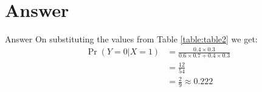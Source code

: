 \documentclass{beamer}
\providecommand{\pr}[1]{\ensuremath{\Pr\left(#1\right)}}
\providecommand{\pr}[1]{\ensuremath{\Pr\left(#1\right)}}
\begin{document}
	\section{Answer}
	\begin{frame}{Answer}
	On substituting the values from Table \eqref{table:table2} we get:
	\begin{align}
		\pr{Y = 0|X = 1} &= \frac{0.4 \times 0.3}{0.6 \times 0.7 + 0.4 \times 0.3} \\
		&= \frac{12}{54}\\
		&= \frac{2}{9}\approx 0.222
	\end{align}
	\end{frame}
\end{document}
